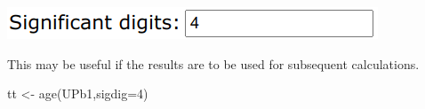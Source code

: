 \begin{refsection}
\begin{enumerate}
\noindent\begin{minipage}[t]{.4\linewidth}
\strut\vspace*{-\baselineskip}\newline
\includegraphics[width=\linewidth]{../figures/UPbAgesSigdig.png}
\end{minipage}
\begin{minipage}[t]{.6\linewidth}
  This may be useful if the results are to be used for subsequent
  calculations.
\end{minipage}

\begin{console}
tt <- age(UPb1,sigdig=4)
\end{console}

\end{enumerate}

\printbibliography[heading=subbibliography]

\end{refsection}
